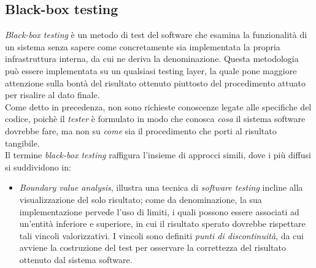 \documentclass{article}
\begin{document}
\subsection*{Black-box testing}
\large
\textit{Black-box testing} è un metodo di test del software che esamina la funzionalità di un sistema senza sapere come concretamente sia implementata la propria infrastruttura interna, da cui ne deriva la denominazione. Questa metodologia può essere implementata su un qualsiasi testing layer, la quale pone maggiore attenzione sulla bontà del risultato ottenuto piuttosto del procedimento attuato per risalire al dato finale.\vspace*{14pt}\\
Come detto in precedenza, non sono richieste conoscenze legate alle specifiche del codice, poichè il \textit{tester} è formulato in modo che conosca \textit{cosa} il sistema software dovrebbe fare, ma non su \textit{come} sia il procedimento che porti al risultato tangibile.\vspace*{14pt}\\
Il termine \textit{black-box testing} raffigura l'insieme di approcci simili, dove i più diffusi si suddividono in:
\begin{itemize}[label={-}]
    \itemsep0em
    \item \textit{Boundary value analysis}, illustra una tecnica di \textit{software testing} incline alla visualizzazione del solo risultato; come da denominazione, la sua implementazione pervede l'uso di limiti, i quali possono essere associati ad un'entità inferiore e superiore, in cui il risultato sperato dovrebbe rispettare tali vincoli valorizzativi. I vincoli sono definiti \textit{punti di discontinuità}, da cui avviene la costruzione del test per osservare la correttezza del risultato ottenuto dal sistema software.   
\end{itemize}
\end{document}
